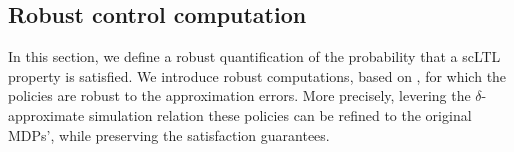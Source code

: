 \documentclass{ifacconf}
\renewcommand{\axx}[1]{{\color{orange} Ali: #1}}
\begin{document}
% 
% 
%


\subsection{Robust control computation}

In this section, we define a robust quantification of the probability that a scLTL property is satisfied.   
We introduce robust computations,  based on
 \citet{tech_report_TACAS}, for which the policies are robust to the approximation errors. More precisely,   levering the $\delta$-approximate simulation relation these policies can be refined to the original MDPs', while preserving the satisfaction guarantees.
\end{document}
